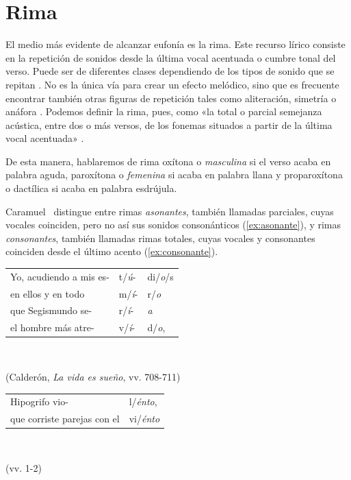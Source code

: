 \section{Rima}
El medio más evidente de alcanzar eufonía es la rima. Este recurso lírico consiste en la repetición de sonidos desde la última vocal acentuada o cumbre tonal del verso. Puede ser de diferentes clases dependiendo de los tipos de sonido que se repitan \parencite[103-115]{dominguez2014a}. No es la única vía para crear un efecto melódico, sino que es frecuente encontrar también otras figuras de repetición tales como aliteración, simetría o anáfora \parencite[126-129]{dominguez2014a}. Podemos definir la rima, pues, como «la total o parcial semejanza acústica, entre dos o más versos, de los fonemas situados a partir de la última vocal acentuada» \parencite[37]{quilis2013}.

De esta manera, hablaremos de rima oxítona o \textit{masculina} si el verso acaba en palabra aguda, paroxítona o \textit{femenina} si acaba en palabra llana y proparoxítona o dactílica si acaba en palabra esdrújula.

Caramuel~\parencite*[57]{caramuel2007} distingue entre rimas \textit{asonantes}, también llamadas parciales, cuyas vocales coinciden, pero no así sus sonidos consonánticos (\ref{ex:asonante}), y rimas \textit{consonantes}, también llamadas rimas totales, cuyas vocales y consonantes coinciden desde el último acento (\ref{ex:consonante}). 

\begin{exe}
	\ex\label{ex:asonante}
	\begin{tabular}{l|ll|}
		\cline{2-3}
		Yo, acudiendo a mis es-&t/\textit{ú}-& di/\textit{o}/s\\
		en ellos y en todo &m/\textit{í}-& r/\textit{o}\\
		que Segismundo se- &r/\textit{í}-& \textit{a}\\
		el hombre más atre-&v/\textit{í}-& d/\textit{o},\\\cline{2-3}
	\end{tabular}\\\strut\hfill(Calderón, \textit{La vida es sueño}, vv. 708-711\nocite{calderon_lavidaessuenno})
	\ex\label{ex:consonante}
	\begin{tabular}{l|l|}
		\cline{2-2}
		Hipogrifo vio-&l/\textit{énto},\\
		que corriste parejas con el&vi/\textit{énto}\\\cline{2-2}
	\end{tabular}\\\strut\hfill(vv. 1-2)	
\end{exe}

